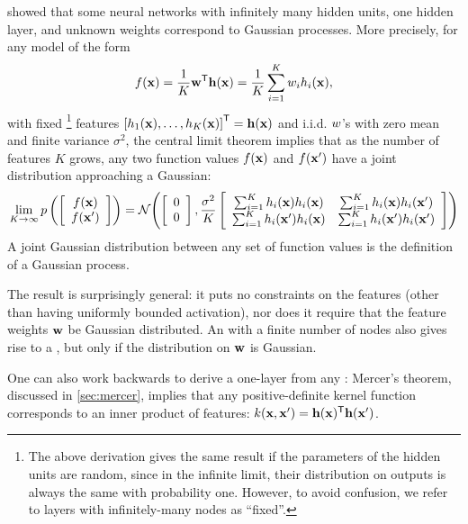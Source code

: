 \citet[chapter 2]{neal1995bayesian} showed that some neural networks with infinitely many hidden units, one hidden layer, and unknown weights correspond to Gaussian processes.
More precisely, for any model of the form
%
\begin{align}
f({\bf{x}}) = \frac{1}{K}{\mathbf {{\bf{w}}}}^{\mathsf{T}} {\bf{h}}({\bf{x}}) = \frac{1}{K} \sum_{i=1}^K w_i h_i({\bf{x}}),
\label{eq:one-layer-gp}
\end{align}
%
with fixed%
\footnote{The above derivation gives the same result if the parameters of the hidden units are random, since in the infinite limit, their distribution on outputs is always the same with probability one.
However, to avoid confusion, we refer to layers with infinitely-many nodes as ``fixed''.
}
 features $\left[ h_1({\bf{x}}), \dots, h_K({\bf{x}}) \right]^{\mathsf{T}} = {\bf{h}}({\bf{x}})$ and i.i.d. $w$'s with zero mean and finite variance $\sigma^2$, the central limit theorem implies that as the number of features $K$ grows, any two function values $f({\bf{x}})$ and $f({\bf{x}}')$ have a joint distribution approaching a Gaussian:
%
\begin{align}
\lim_{K \to \infty} p\left( \left[ \begin{array}{c} {f({\bf{x}})} \\ {f({\bf{x}}')} \end{array} \right] \right) = \mathcal{N}\!\left(\left[ \begin{array}{c} {0} \\ {0} \end{array} \right],
\frac{\sigma^2}{K} \left[ \begin{array}{cc}
\sum_{i=1}^K h_i({\bf{x}})h_i({\bf{x}}) &
\sum_{i=1}^K h_i({\bf{x}})h_i({\bf{x}}') \\
\sum_{i=1}^K h_i({\bf{x}}')h_i({\bf{x}}) &
\sum_{i=1}^K h_i({\bf{x}}')h_i({\bf{x}}')
\end{array} \right] \right)
\end{align}
A joint Gaussian distribution between any set of function values is the definition of a Gaussian process.

The result is surprisingly general:
it puts no constraints on the features (other than having uniformly bounded activation), nor does it require that the feature weights ${\bf{w}}$ be Gaussian distributed.  
An \MLP{} with a finite number of nodes also gives rise to a \gp{}, but only if the distribution on ${\bf{w}}$ is Gaussian.


One can also work backwards to derive a one-layer \MLP{} from any \gp{}:
Mercer's theorem, discussed in \cref{sec:mercer}, implies that any positive-definite kernel function corresponds to an inner product of features: $k({\bf{x}}, {\bf{x}}') = {\bf{h}}({\bf{x}}) ^{\mathsf{T}} {\bf{h}}({\bf{x}}')$.

